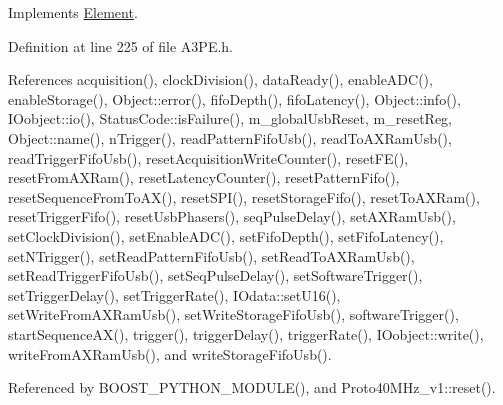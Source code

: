 Implements \hyperlink{classElement_a69efffa22f06909d768149715565cb56}{Element}.



Definition at line 225 of file A3\+P\+E.\+h.



References acquisition(), clock\+Division(), data\+Ready(), enable\+A\+D\+C(), enable\+Storage(), Object\+::error(), fifo\+Depth(), fifo\+Latency(), Object\+::info(), I\+Oobject\+::io(), Status\+Code\+::is\+Failure(), m\+\_\+global\+Usb\+Reset, m\+\_\+reset\+Reg, Object\+::name(), n\+Trigger(), read\+Pattern\+Fifo\+Usb(), read\+To\+A\+X\+Ram\+Usb(), read\+Trigger\+Fifo\+Usb(), reset\+Acquisition\+Write\+Counter(), reset\+F\+E(), reset\+From\+A\+X\+Ram(), reset\+Latency\+Counter(), reset\+Pattern\+Fifo(), reset\+Sequence\+From\+To\+A\+X(), reset\+S\+P\+I(), reset\+Storage\+Fifo(), reset\+To\+A\+X\+Ram(), reset\+Trigger\+Fifo(), reset\+Usb\+Phasers(), seq\+Pulse\+Delay(), set\+A\+X\+Ram\+Usb(), set\+Clock\+Division(), set\+Enable\+A\+D\+C(), set\+Fifo\+Depth(), set\+Fifo\+Latency(), set\+N\+Trigger(), set\+Read\+Pattern\+Fifo\+Usb(), set\+Read\+To\+A\+X\+Ram\+Usb(), set\+Read\+Trigger\+Fifo\+Usb(), set\+Seq\+Pulse\+Delay(), set\+Software\+Trigger(), set\+Trigger\+Delay(), set\+Trigger\+Rate(), I\+Odata\+::set\+U16(), set\+Write\+From\+A\+X\+Ram\+Usb(), set\+Write\+Storage\+Fifo\+Usb(), software\+Trigger(), start\+Sequence\+A\+X(), trigger(), trigger\+Delay(), trigger\+Rate(), I\+Oobject\+::write(), write\+From\+A\+X\+Ram\+Usb(), and write\+Storage\+Fifo\+Usb().



Referenced by B\+O\+O\+S\+T\+\_\+\+P\+Y\+T\+H\+O\+N\+\_\+\+M\+O\+D\+U\+L\+E(), and Proto40\+M\+Hz\+\_\+v1\+::reset().


